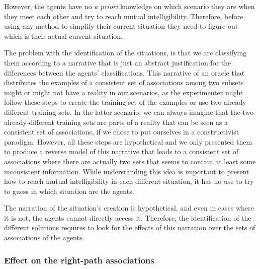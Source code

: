 However, the agents have no \emph{a priori} knowledge on which scenario they are when they meet each other and try to reach mutual intelligibility. Therefore, before using any method to simplify their current situation they need to figure out which is their actual current situation.

The problem with the identification of the situations, is that we are classifying them according to a narrative that is just an abstract justification for the differences between the agents' classifications. This narrative of an oracle that distributes the examples of a consistent set of associations among two subsets might or might not have a reality in our scenarios, as the experimenter might follow these steps to create the training set of the examples or use two already-different training sets. In the latter scenario, we can always imagine that the two already-different training sets are parts of a reality that can be seen as a consistent set of associations, if we chose to put ourselves in a constructivist paradigm. However, all these steps are hypothetical and we only presented them to produce a reverse model of this narrative that leads to a consistent set of associations where there are actually two sets that seems to contain at least some inconsistent information. While understanding this idea is important to present how to reach mutual intelligibility in each different situation, it has no use to try to guess in which situation are the agents.

The narration of the situation's creation is hypothetical, and even in cases where it is not, the agents cannot directly access it. Therefore, the identification of the different solutions requires to look for the effects of this narration over the sets of associations of the agents.

\subsubsection{Effect on the right-path associations}

